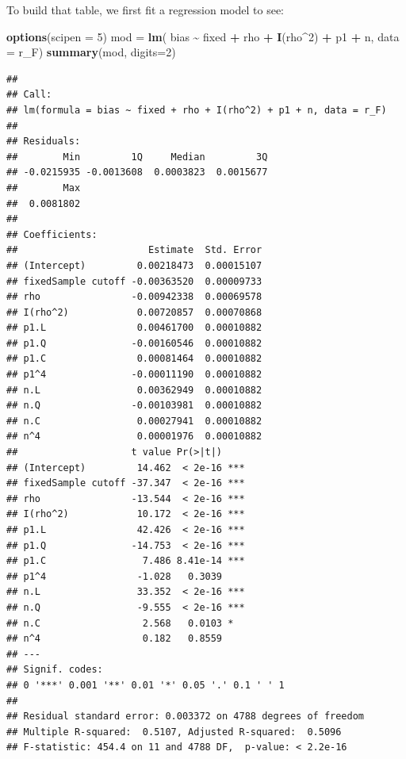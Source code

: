 \documentclass[
]{book}
\newenvironment{Shaded}{\begin{snugshade}}{\end{snugshade}}
\newcommand{\AttributeTok}[1]{\textcolor[rgb]{0.13,0.29,0.53}{#1}}
\newcommand{\DecValTok}[1]{\textcolor[rgb]{0.00,0.00,0.81}{#1}}
\newcommand{\FunctionTok}[1]{\textcolor[rgb]{0.13,0.29,0.53}{\textbf{#1}}}
\newcommand{\NormalTok}[1]{#1}
\newcommand{\OtherTok}[1]{\textcolor[rgb]{0.56,0.35,0.01}{#1}}
\newcommand{\SpecialCharTok}[1]{\textcolor[rgb]{0.81,0.36,0.00}{\textbf{#1}}}
\begin{document}
To build that table, we first fit a regression model to see:

\begin{Shaded}
\begin{Highlighting}[]
\FunctionTok{options}\NormalTok{(}\AttributeTok{scipen =} \DecValTok{5}\NormalTok{)}
\NormalTok{mod }\OtherTok{=} \FunctionTok{lm}\NormalTok{( bias }\SpecialCharTok{\textasciitilde{}}\NormalTok{ fixed }\SpecialCharTok{+}\NormalTok{ rho }\SpecialCharTok{+} \FunctionTok{I}\NormalTok{(rho}\SpecialCharTok{\^{}}\DecValTok{2}\NormalTok{) }\SpecialCharTok{+}\NormalTok{ p1 }\SpecialCharTok{+}\NormalTok{ n, }\AttributeTok{data =}\NormalTok{ r\_F)}
\FunctionTok{summary}\NormalTok{(mod, }\AttributeTok{digits=}\DecValTok{2}\NormalTok{)}
\end{Highlighting}
\end{Shaded}

\begin{verbatim}
## 
## Call:
## lm(formula = bias ~ fixed + rho + I(rho^2) + p1 + n, data = r_F)
## 
## Residuals:
##        Min         1Q     Median         3Q 
## -0.0215935 -0.0013608  0.0003823  0.0015677 
##        Max 
##  0.0081802 
## 
## Coefficients:
##                       Estimate  Std. Error
## (Intercept)         0.00218473  0.00015107
## fixedSample cutoff -0.00363520  0.00009733
## rho                -0.00942338  0.00069578
## I(rho^2)            0.00720857  0.00070868
## p1.L                0.00461700  0.00010882
## p1.Q               -0.00160546  0.00010882
## p1.C                0.00081464  0.00010882
## p1^4               -0.00011190  0.00010882
## n.L                 0.00362949  0.00010882
## n.Q                -0.00103981  0.00010882
## n.C                 0.00027941  0.00010882
## n^4                 0.00001976  0.00010882
##                    t value Pr(>|t|)    
## (Intercept)         14.462  < 2e-16 ***
## fixedSample cutoff -37.347  < 2e-16 ***
## rho                -13.544  < 2e-16 ***
## I(rho^2)            10.172  < 2e-16 ***
## p1.L                42.426  < 2e-16 ***
## p1.Q               -14.753  < 2e-16 ***
## p1.C                 7.486 8.41e-14 ***
## p1^4                -1.028   0.3039    
## n.L                 33.352  < 2e-16 ***
## n.Q                 -9.555  < 2e-16 ***
## n.C                  2.568   0.0103 *  
## n^4                  0.182   0.8559    
## ---
## Signif. codes:  
## 0 '***' 0.001 '**' 0.01 '*' 0.05 '.' 0.1 ' ' 1
## 
## Residual standard error: 0.003372 on 4788 degrees of freedom
## Multiple R-squared:  0.5107, Adjusted R-squared:  0.5096 
## F-statistic: 454.4 on 11 and 4788 DF,  p-value: < 2.2e-16
\end{verbatim}
\end{document}
